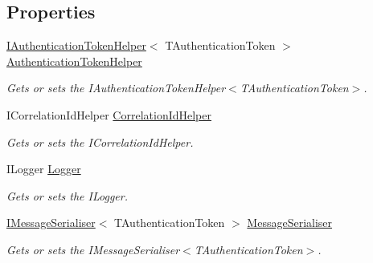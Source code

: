 \subsection*{Properties}
\begin{DoxyCompactItemize}
\item 
\hyperlink{interfaceCqrs_1_1Authentication_1_1IAuthenticationTokenHelper}{I\+Authentication\+Token\+Helper}$<$ T\+Authentication\+Token $>$ \hyperlink{classCqrs_1_1Azure_1_1ServiceBus_1_1AzureBusHelper_abe32e0fe4ef131a0ae209b75eadcbbcd_abe32e0fe4ef131a0ae209b75eadcbbcd}{Authentication\+Token\+Helper}
\begin{DoxyCompactList}\small\item\em Gets or sets the I\+Authentication\+Token\+Helper$<$\+T\+Authentication\+Token$>$. \end{DoxyCompactList}\item 
I\+Correlation\+Id\+Helper \hyperlink{classCqrs_1_1Azure_1_1ServiceBus_1_1AzureBusHelper_a5c9a3cd9afaf6d915afc08c34c4731be_a5c9a3cd9afaf6d915afc08c34c4731be}{Correlation\+Id\+Helper}
\begin{DoxyCompactList}\small\item\em Gets or sets the I\+Correlation\+Id\+Helper. \end{DoxyCompactList}\item 
I\+Logger \hyperlink{classCqrs_1_1Azure_1_1ServiceBus_1_1AzureBusHelper_afc8a2a2592bbd8332d1f7dcafc4de5eb_afc8a2a2592bbd8332d1f7dcafc4de5eb}{Logger}
\begin{DoxyCompactList}\small\item\em Gets or sets the I\+Logger. \end{DoxyCompactList}\item 
\hyperlink{interfaceCqrs_1_1Azure_1_1ServiceBus_1_1IMessageSerialiser}{I\+Message\+Serialiser}$<$ T\+Authentication\+Token $>$ \hyperlink{classCqrs_1_1Azure_1_1ServiceBus_1_1AzureBusHelper_a6bb1cf0ca846ef1589a3b54a1cff17ed_a6bb1cf0ca846ef1589a3b54a1cff17ed}{Message\+Serialiser}
\begin{DoxyCompactList}\small\item\em Gets or sets the I\+Message\+Serialiser$<$\+T\+Authentication\+Token$>$. \end{DoxyCompactList}\item 

\end{DoxyCompactItemize}
